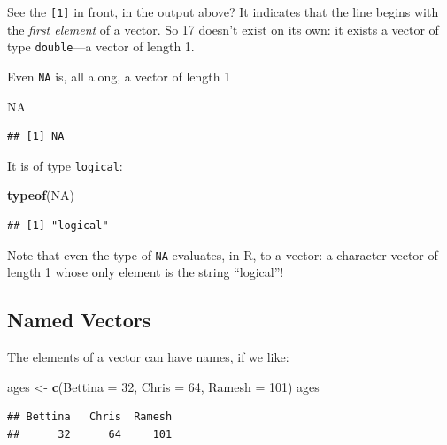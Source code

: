 \documentclass[]{book}
\makeatletter
\newenvironment{Shaded}{\begin{snugshade}}{\end{snugshade}}
\newcommand{\KeywordTok}[1]{\textcolor[rgb]{0.13,0.29,0.53}{\textbf{#1}}}
\newcommand{\DataTypeTok}[1]{\textcolor[rgb]{0.13,0.29,0.53}{#1}}
\newcommand{\DecValTok}[1]{\textcolor[rgb]{0.00,0.00,0.81}{#1}}
\newcommand{\StringTok}[1]{\textcolor[rgb]{0.31,0.60,0.02}{#1}}
\newcommand{\OtherTok}[1]{\textcolor[rgb]{0.56,0.35,0.01}{#1}}
\newcommand{\NormalTok}[1]{#1}
\newenvironment{kframe}{%
\medskip{}
\setlength{\fboxsep}{.8em}
 \def\at@end@of@kframe{}%
 \ifinner\ifhmode%
  \def\at@end@of@kframe{\end{minipage}}%
  \begin{minipage}{\columnwidth}%
 \fi\fi%
 \def\FrameCommand##1{\hskip\@totalleftmargin \hskip-\fboxsep
 \colorbox{shadecolor}{##1}\hskip-\fboxsep
     \hskip-\linewidth \hskip-\@totalleftmargin \hskip\columnwidth}%
 \MakeFramed {\advance\hsize-\width
   \@totalleftmargin\z@ \linewidth\hsize
   \@setminipage}}%
 {\par\unskip\endMakeFramed%
 \at@end@of@kframe}
\renewenvironment{Shaded}{\begin{kframe}}{\end{kframe}}
\theoremstyle{definition}
\theoremstyle{definition}
\theoremstyle{definition}
\theoremstyle{remark}
\makeatother
\begin{document}
See the \texttt{{[}1{]}} in front, in the output above? It indicates
that the line begins with the \emph{first element} of a vector. So 17
doesn't exist on its own: it exists a vector of type \texttt{double}---a
vector of length 1.

Even \texttt{NA} is, all along, a vector of length 1

\begin{Shaded}
\begin{Highlighting}[]
\OtherTok{NA}
\end{Highlighting}
\end{Shaded}

\begin{verbatim}
## [1] NA
\end{verbatim}

It is of type \texttt{logical}:

\begin{Shaded}
\begin{Highlighting}[]
\KeywordTok{typeof}\NormalTok{(}\OtherTok{NA}\NormalTok{)}
\end{Highlighting}
\end{Shaded}

\begin{verbatim}
## [1] "logical"
\end{verbatim}

Note that even the type of \texttt{NA} evaluates, in R, to a vector: a
character vector of length 1 whose only element is the string
``logical''!

\subsection{Named Vectors}\label{named-vectors}

The elements of a vector can have names, if we like:

\begin{Shaded}
\begin{Highlighting}[]
\NormalTok{ages <-}\StringTok{ }\KeywordTok{c}\NormalTok{(}\DataTypeTok{Bettina =} \DecValTok{32}\NormalTok{, }\DataTypeTok{Chris =} \DecValTok{64}\NormalTok{, }\DataTypeTok{Ramesh =} \DecValTok{101}\NormalTok{)}
\NormalTok{ages}
\end{Highlighting}
\end{Shaded}

\begin{verbatim}
## Bettina   Chris  Ramesh 
##      32      64     101
\end{verbatim}
\end{document}
